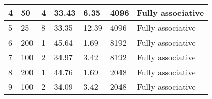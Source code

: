 \begin{table}[h!]
{\begin{tabular}{|l|l|l|l|l|l|l|}
4                          & 50                                                                              & 4                            & 33.43                                                                             & 6.35                                                                           & 4096                                                                               & Fully associative               \\ \hline
5                          & 25                                                                              & 8                            & 33.35                                                                             & 12.39                                                                          & 4096                                                                               & Fully associative               \\ \hline
6                          & 200                                                                             & 1                            & 45.64                                                                             & 1.69                                                                           & 8192                                                                               & Fully associative               \\ \hline
7                          & 100                                                                             & 2                            & 34.97                                                                             & 3.42                                                                           & 8192                                                                               & Fully associative               \\ \hline
8                          & 200                                                                             & 1                            & 44.76                                                                             & 1.69                                                                           & 2048                                                                               & Fully associative               \\ \hline
9                          & 100                                                                             & 2                            & 34.09                                                                             & 3.42                                                                           & 2048                                                                               & Fully associative               \\ \hline
\end{tabular}%
}
\end{table}
